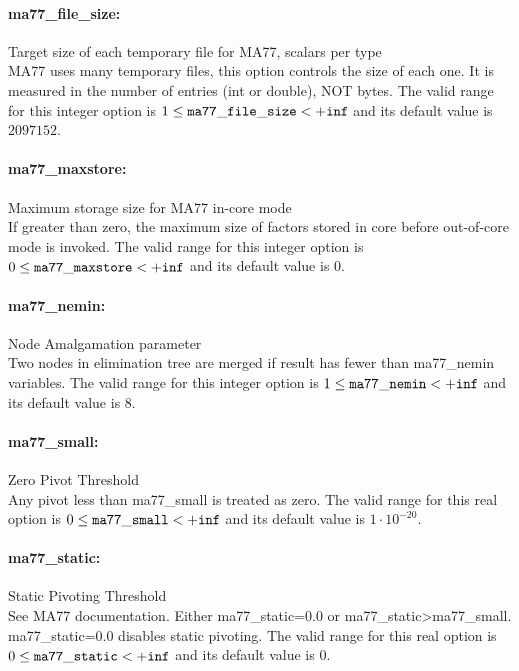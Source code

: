 \paragraph{ma77\_file\_size:}\label{opt:ma77_file_size} Target size of each temporary file for MA77, scalars per type \\
 MA77 uses many temporary files, this option controls the size of each one. It is measured in the number of entries (int or double), NOT bytes. The valid range for this integer option is
$1 \le {\tt ma77\_file\_size } <  {\tt +inf}$
and its default value is $2097152$.


\paragraph{ma77\_maxstore:}\label{opt:ma77_maxstore} Maximum storage size for MA77 in-core mode \\
 If greater than zero, the maximum size of factors stored in core before out-of-core mode is invoked. The valid range for this integer option is
$0 \le {\tt ma77\_maxstore } <  {\tt +inf}$
and its default value is $0$.


\paragraph{ma77\_nemin:}\label{opt:ma77_nemin} Node Amalgamation parameter \\
 Two nodes in elimination tree are merged if result has fewer than ma77\_nemin variables. The valid range for this integer option is
$1 \le {\tt ma77\_nemin } <  {\tt +inf}$
and its default value is $8$.


\paragraph{ma77\_small:}\label{opt:ma77_small} Zero Pivot Threshold \\
 Any pivot less than ma77\_small is treated as zero. The valid range for this real option is 
$0 \le {\tt ma77\_small } <  {\tt +inf}$
and its default value is $1 \cdot 10^{-20}$.


\paragraph{ma77\_static:}\label{opt:ma77_static} Static Pivoting Threshold \\
 See MA77 documentation. Either ma77\_static=0.0 or ma77\_static>ma77\_small. ma77\_static=0.0 disables static pivoting. The valid range for this real option is 
$0 \le {\tt ma77\_static } <  {\tt +inf}$
and its default value is $0$.


